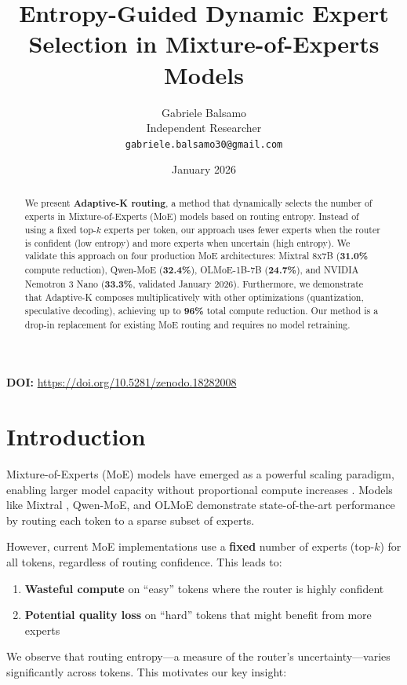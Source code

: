 \documentclass{article}
\title{Entropy-Guided Dynamic Expert Selection in Mixture-of-Experts Models}
\author{
  Gabriele Balsamo\\
  Independent Researcher\\
  \texttt{gabriele.balsamo30@gmail.com}
}
\date{January 2026}
\begin{document}
\maketitle

\noindent\textbf{DOI:} \url{https://doi.org/10.5281/zenodo.18282008}\\[1em]

\begin{abstract}
We present \textbf{Adaptive-K routing}, a method that dynamically selects the number of experts in Mixture-of-Experts (MoE) models based on routing entropy. Instead of using a fixed top-$k$ experts per token, our approach uses fewer experts when the router is confident (low entropy) and more experts when uncertain (high entropy). We validate this approach on four production MoE architectures: Mixtral 8x7B (\textbf{31.0\%} compute reduction), Qwen-MoE (\textbf{32.4\%}), OLMoE-1B-7B (\textbf{24.7\%}), and NVIDIA Nemotron 3 Nano (\textbf{33.3\%}, validated January 2026). Furthermore, we demonstrate that Adaptive-K composes multiplicatively with other optimizations (quantization, speculative decoding), achieving up to \textbf{96\%} total compute reduction. Our method is a drop-in replacement for existing MoE routing and requires no model retraining.
\end{abstract}

\section{Introduction}

Mixture-of-Experts (MoE) models have emerged as a powerful scaling paradigm, enabling larger model capacity without proportional compute increases \citep{shazeer2017outrageously, fedus2022switch}. Models like Mixtral \citep{jiang2024mixtral}, Qwen-MoE, and OLMoE demonstrate state-of-the-art performance by routing each token to a sparse subset of experts.

However, current MoE implementations use a \textbf{fixed} number of experts (top-$k$) for all tokens, regardless of routing confidence. This leads to:
\begin{enumerate}
    \item \textbf{Wasteful compute} on ``easy'' tokens where the router is highly confident
    \item \textbf{Potential quality loss} on ``hard'' tokens that might benefit from more experts
\end{enumerate}

We observe that routing entropy---a measure of the router's uncertainty---varies significantly across tokens. This motivates our key insight:
\end{document}
